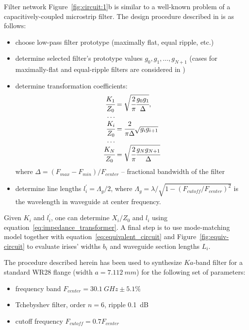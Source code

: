 \documentclass{pj}
\begin{document}
Filter network Figure~\ref{fig:circuit:1}b is similar to a well-known
problem of a capacitively-coupled microstrip filter. The design
procedure described in \cite{pozar2012microwave} is as follows:
\begin{itemize}
\item choose low-pass filter prototype (maximally flat, equal ripple, etc.)
\item determine selected filter's prototype values
  $g_0, g_1, \dots, g_{N+1}$ (cases for maximally-flat and
  equal-ripple filters are considered in \cite{matthaei1980})
\item determine transformation coefficients:
  \begin{equation}
    \begin{array}{r@{}l}
      \cfrac{K_1}{Z_0} &{}= \sqrt{\cfrac{2}{\pi} \cfrac{g_0g_1}{\Delta}}, \\
      \dots \\
      \cfrac{K_i}{Z_0} &{}= \cfrac{2}{\pi \Delta}\sqrt{g_i g_{i+1}} \\
      \dots \\
      \cfrac{K_N}{Z_0} &{}= \sqrt{\cfrac{2}{\pi} \cfrac{g_N g_{N+1}}{\Delta}}
    \end{array}
    \label{eq:trans_coeff}    
  \end{equation}
  where $\Delta = (F_{max}-F_{min})/F_{center}$ -- fractional
  bandwidth of the filter
\item determine line lengths $l^{\prime}_i = \Lambda_g/2$, where
  $\Lambda_g = \lambda / \sqrt{1-(F_{cutoff}/F_{center})^2}$ is the
  wavelength in waveguide at center frequency.
\end{itemize}

Given $K_i$ and $l^{\prime}_i$, one can determine $X_i/Z_0$ and
$l_i$ using equation~\eqref{eq:impedance_transformer}. A final step
is to use mode-matching model together with
equation~\eqref{eq:equivalent_circuit} and
Figure~\ref{fig:equiv-circuit} to evaluate irises' widths
$b_i$ and waveguide section lengths $L_i$.

The procedure described herein has been used to synthesize $Ka$-band
filter for a standard WR28 flange (width $a = 7.112~mm$) for the
following set of parameters:
\begin{itemize}
\item frequency band $F_{center} = 30.1~GHz \pm 5.1\%$
\item Tchebyshev filter, order $n = 6$, ripple 0.1~dB
\item cutoff frequency $F_{cutoff} = 0.7 F_{center}$
\end{itemize}
\end{document}
